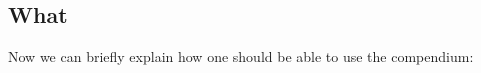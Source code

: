 %
%
%
%
%



\subsection{What}

Now we can briefly explain how one should be able to use the compendium:

